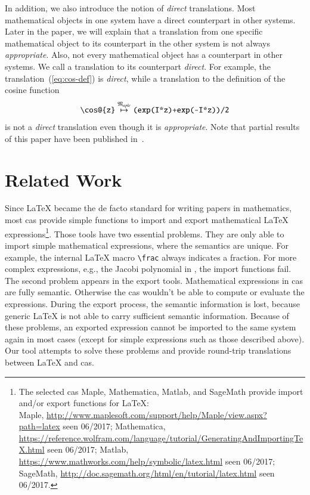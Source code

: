 \documentclass[a4paper,11pt]{article}
\newcommand{\langMaple}{\mathfrak{M}_{aple}}
\theoremstyle{defTheoStyle}
\theoremstyle{defExampStyle}
\begin{document}
	In addition, we also introduce the notion of \textit{direct} translations. Most mathematical objects in one system have a direct counterpart in other systems. Later in the paper, we will explain that a translation from one specific mathematical object to its counterpart in the other system is not always \textit{appropriate}. Also, not every mathematical object has a counterpart in other systems. We call a translation to its counterpart \textit{direct}. For example, the translation~(\ref{eq:cos-def}) is \textit{direct}, while a translation to the definition of the cosine function
	\begin{equation*}
		\verb|\cos@{z}| \overset{\langMaple}{\mapsto} \verb|(exp(I*z)+exp(-I*z))/2|
	\end{equation*}
	is not a \textit{direct} translation even though it is {\it appropriate}.
	Note that partial results of this paper have been published in~\parencite{CICM:Paper}.
	
	\section{Related Work}\label{sec:related-work}
	Since \LaTeX{} became the de facto standard for writing papers in mathematics, most \gls*{cas} provide simple functions to import and export mathematical \LaTeX{} expressions\footnote{The selected \gls*{cas} Maple, Mathematica, Matlab, and SageMath provide import and/or export functions for \LaTeX:\\
		Maple, \url{http://www.maplesoft.com/support/help/Maple/view.aspx?path=latex} seen 06/2017;
		Mathematica, \url{https://reference.wolfram.com/language/tutorial/GeneratingAndImportingTeX.html} seen 06/2017;
		Matlab, \url{https://www.mathworks.com/help/symbolic/latex.html} seen 06/2017;
		SageMath, \url{http://doc.sagemath.org/html/en/tutorial/latex.html} seen 06/2017.}. Those tools have two essential problems. They are only able to import simple mathematical expressions, where the semantics are unique. For example, the internal \LaTeX{} macro \verb|\frac| always indicates a fraction. For more complex expressions, e.g., the Jacobi polynomial in , the import functions fail. The second problem appears in the export tools. Mathematical expressions in \gls*{cas} are fully semantic. Otherwise the \gls*{cas} wouldn't be able to compute or evaluate the expressions. During the export process, the semantic information is lost, because generic \LaTeX{} is not able to carry sufficient semantic information. Because of these problems, an exported expression cannot be imported to the same system again in most cases (except for simple expressions such as those described above). Our tool attempts to solve these problems and provide round-trip translations between \LaTeX{} and \gls*{cas}.
	
\end{document}
